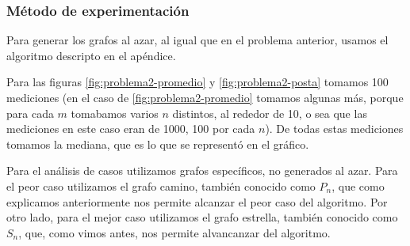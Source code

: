 \subsubsection{M\'etodo de experimentación}

Para generar los grafos al azar, al igual que en el problema anterior, usamos el algoritmo descripto en el apéndice.

Para las figuras \ref{fig:problema2-promedio} y \ref{fig:problema2-posta} tomamos 100 mediciones (en el caso de \ref{fig:problema2-promedio} tomamos algunas más, porque para cada $m$ tomabamos varios $n$ distintos, al rededor de 10, o sea que las mediciones en este caso eran de 1000, 100 por cada $n$). De todas estas mediciones tomamos la mediana, que es lo que se representó en el gráfico.

Para el análisis de casos utilizamos grafos específicos, no generados al azar. Para el peor caso utilizamos el grafo camino, también conocido como $P_n$, que como explicamos anteriormente nos permite alcanzar el peor caso del algoritmo.
Por otro lado, para el mejor caso utilizamos el grafo estrella, también conocido como $S_n$, que, como vimos antes, nos permite alvancanzar del algoritmo.



